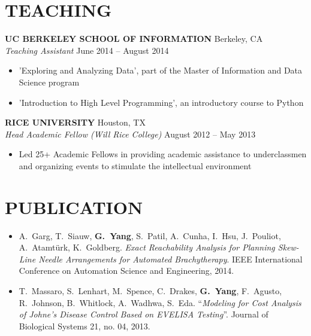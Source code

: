 \documentclass[margin]{res}
\begin{document}
\begin{resume}
\section{TEACHING}
{\bf UC BERKELEY SCHOOL OF INFORMATION} Berkeley, CA \\
{\em Teaching Assistant} \hfill
June 2014 -- August 2014 \\                                          \vspace{-4mm}
\begin{itemize}                                         \itemsep1pt %
        \item   'Exploring and Analyzing Data', part of the Master of Information and Data Science program
        \item   'Introduction to High Level Programming', an introductory course to Python
\end{itemize}
\vspace{-2mm}

{\bf RICE UNIVERSITY} Houston, TX \\
{\em Head Academic Fellow (Will Rice College)} \hfill
August 2012 -- May 2013 \\                                          \vspace{-4mm}
\begin{itemize}                                         \itemsep1pt %
        \item   Led 25+ Academic Fellows in providing academic assistance to underclassmen and organizing events to stimulate the intellectual environment
\end{itemize}
\vspace{-2mm}
\section{PUBLICATION}
\begin{itemize}                                                 \itemsep1pt
        \item   A.\ Garg, T.\ Siauw, \textbf{G.\ Yang}, S.\ Patil, A.\ Cunha, I.\ Hsu, J.\ Pouliot, A.\ Atamt\"urk, K.\ Goldberg. \textit{Exact Reachability Analysis for Planning Skew-Line Needle Arrangements for Automated Brachytherapy}. IEEE International Conference on Automation Science and Engineering, 2014.
        \item  T.\ Massaro, S.\ Lenhart, M.\ Spence, C.\ Drakes, \textbf{G.\ Yang}, F.\ Agusto, R.\ Johnson, B.\ Whitlock, A.\ Wadhwa, S.\ Eda. ``\emph{Modeling for Cost Analysis of Johne's Disease Control Based on EVELISA Testing}''. Journal of Biological Systems 21, no. 04, 2013.
\end{itemize}
\vspace{-2mm}


\end{resume}
\end{document}
